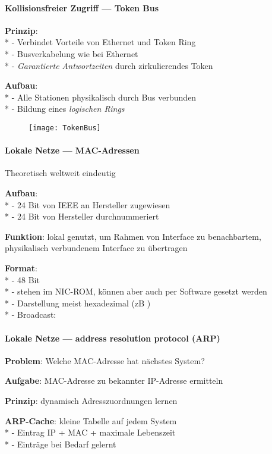 \paragraph{Kollisionsfreier Zugriff --- Token Bus}
\begin{items}
  \item \textbf{Prinzip}: \\*
    - Verbindet Vorteile von Ethernet und Token Ring \\*
    - Busverkabelung wie bei Ethernet \\*
    - \emph{Garantierte Antwortzeiten} durch zirkulierendes Token
  \item \textbf{Aufbau}: \\*
    - Alle Stationen physikalisch durch Bus verbunden \\*
    - Bildung eines \emph{logischen Rings}
\end{items}
\begin{figure}[H]\centering\label{TokenBus}\texttt{[image: TokenBus]}\end{figure}

\paragraph{Lokale Netze --- MAC-Adressen}
\begin{items}
  \item Theoretisch weltweit eindeutig
  \item \textbf{Aufbau}: \\*
    - 24 Bit von IEEE an Hersteller zugewiesen \\*
    - 24 Bit von Hersteller durchnummeriert
  \item \textbf{Funktion}: lokal genutzt, um Rahmen von Interface zu benachbartem, physikalisch verbundenem Interface zu übertragen
  \item \textbf{Format}: \\*
    - 48 Bit \\*
    - stehen im NIC-ROM, können aber auch per Software gesetzt werden \\*
    - Darstellung meist hexadezimal (zB ) \\*
    - Broadcast: 
\end{items}

\paragraph{Lokale Netze --- address resolution protocol (ARP)}
\begin{items}
  \item \textbf{Problem}: Welche MAC-Adresse hat nächstes System?
  \item \textbf{Aufgabe}: MAC-Adresse zu bekannter IP-Adresse ermitteln
  \item \textbf{Prinzip}: dynamisch Adresszuordnungen lernen
  \item \textbf{ARP-Cache}: kleine Tabelle auf jedem System \\*
    - Eintrag IP + MAC + maximale Lebenszeit \\*
    - Einträge bei Bedarf gelernt
\end{items}

